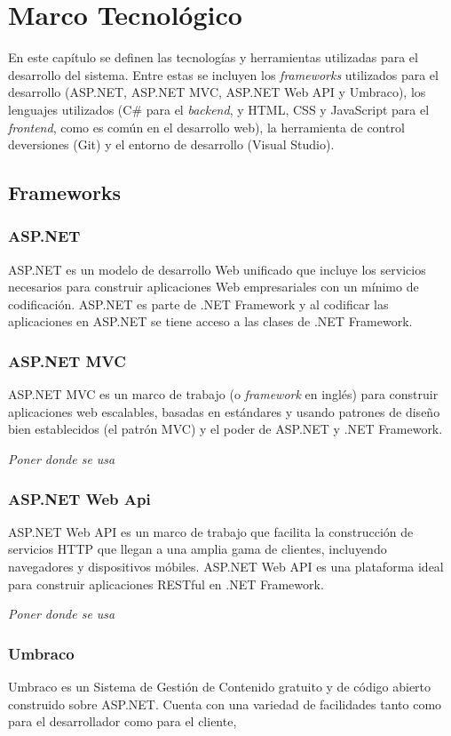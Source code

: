 \chapter{Marco Tecnológico}
En este capítulo se definen las tecnologías y herramientas utilizadas para el desarrollo del sistema. Entre estas se incluyen los \textit{frameworks} utilizados para el desarrollo (ASP.NET, ASP.NET MVC, ASP.NET Web API y Umbraco), los lenguajes utilizados (C\# para el \textit{backend}, y HTML, CSS y JavaScript para el \textit{frontend}, como es común en el desarrollo web), la herramienta de control deversiones (Git) y el entorno de desarrollo (Visual Studio).

\section{Frameworks}
\subsection{ASP.NET}
ASP.NET es un modelo de desarrollo Web unificado que incluye los servicios necesarios para construir aplicaciones Web empresariales con un mínimo de codificación. ASP.NET es parte de .NET Framework y al codificar las aplicaciones en ASP.NET se tiene acceso a las clases de .NET Framework. \cite{asp.netMicrosoft}

\subsection{ASP.NET MVC}
ASP.NET MVC es un marco de trabajo (o \textit{framework} en inglés) para construir aplicaciones web escalables, basadas en estándares y usando patrones de diseño bien establecidos (el patrón MVC) y el poder de ASP.NET y .NET Framework. \cite{asp.netMVCMicrosoft}

\emph{Poner donde se usa}

\subsection{ASP.NET Web Api}
ASP.NET Web API es un marco de trabajo que facilita la construcción de servicios HTTP que llegan a una amplia gama de clientes, incluyendo navegadores y dispositivos móbiles. ASP.NET Web API es una plataforma ideal para construir aplicaciones RESTful en .NET Framework. \cite{asp.netWebAPIMicrosoft}

\emph{Poner donde se usa}

\subsection{Umbraco}
Umbraco es un Sistema de Gestión de Contenido gratuito y de código abierto construido sobre ASP.NET. Cuenta con una variedad de facilidades tanto como para el desarrollador como para el cliente, 

